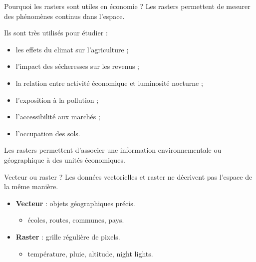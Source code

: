 \documentclass[
  10pt,
  ignorenonframetext,
]{beamer}
\begin{document}
\begin{frame}{Pourquoi les rasters sont utiles en économie ?}
\label{pourquoi-les-rasters-sont-utiles-en-uxe9conomie}
Les rasters permettent de mesurer des phénomènes continus dans l'espace.

Ils sont très utilisés pour étudier :

\begin{itemize}
  \item les effets du climat sur l’agriculture ;
  \item l’impact des sécheresses sur les revenus ;
  \item la relation entre activité économique et luminosité nocturne ;
  \item l’exposition à la pollution ;
  \item l’accessibilité aux marchés ;
  \item l’occupation des sols.
\end{itemize}

Les rasters permettent d'associer une information environnementale ou
géographique à des unités économiques.
\end{frame}

\begin{frame}{Vecteur ou raster ?}
\label{vecteur-ou-raster}
Les données vectorielles et raster ne décrivent pas l'espace de la même
manière.

\begin{itemize}
  \item \textbf{Vecteur} : objets géographiques précis.
  \begin{itemize}
    \item écoles, routes, communes, pays.
  \end{itemize}

  \item \textbf{Raster} : grille régulière de pixels.
  \begin{itemize}
    \item température, pluie, altitude, night lights.
  \end{itemize}
\end{itemize}
\end{frame}
\end{document}
